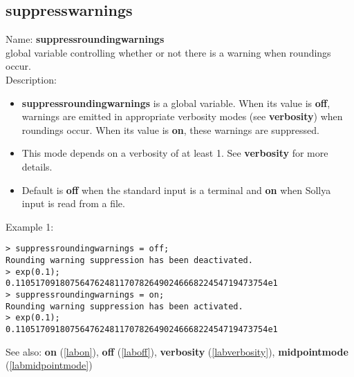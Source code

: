\subsection{suppresswarnings}
\label{labsuppresswarnings}
\noindent Name: \textbf{suppressroundingwarnings}\\
global variable controlling whether or not there is a warning when roundings occur.\\

\noindent Description: \begin{itemize}

\item \textbf{suppressroundingwarnings} is a global variable. When its value is \textbf{off}, warnings are
   emitted in appropriate verbosity modes (see \textbf{verbosity}) when roundings
   occur.  When its value is \textbf{on}, these warnings are suppressed.

\item This mode depends on a verbosity of at least 1. See
   \textbf{verbosity} for more details.

\item Default is \textbf{off} when the standard input is a terminal and
   \textbf{on} when Sollya input is read from a file.
\end{itemize}
\noindent Example 1: 
\begin{center}\begin{minipage}{15cm}\begin{Verbatim}[frame=single]
> suppressroundingwarnings = off;
Rounding warning suppression has been deactivated.
> exp(0.1);
0.110517091807564762481170782649024666822454719473754e1
> suppressroundingwarnings = on;
Rounding warning suppression has been activated.
> exp(0.1);
0.110517091807564762481170782649024666822454719473754e1
\end{Verbatim}
\end{minipage}\end{center}
See also: \textbf{on} (\ref{labon}), \textbf{off} (\ref{laboff}), \textbf{verbosity} (\ref{labverbosity}), \textbf{midpointmode} (\ref{labmidpointmode})
